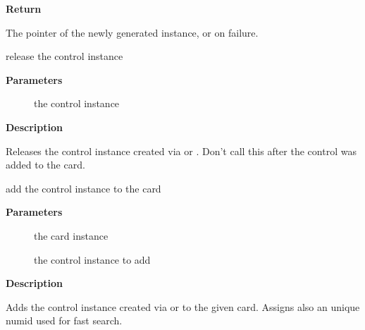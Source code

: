 \documentclass[a4paper,8pt,english]{sphinxmanual}
\begin{document}
\textbf{Return}

The pointer of the newly generated instance, or  on failure.

\begin{fulllineitems}
\label{sound/kernel-api/alsa-driver-api:c.snd_ctl_free_one}
release the control instance

\end{fulllineitems}


\textbf{Parameters}
\begin{description}
\item[{}] \leavevmode
the control instance

\end{description}

\textbf{Description}

Releases the control instance created via {\hyperref[sound/kernel\string-api/alsa\string-driver\string-api:c.snd_ctl_new]{\emph{}}}
or .
Don't call this after the control was added to the card.

\begin{fulllineitems}
\label{sound/kernel-api/alsa-driver-api:c.snd_ctl_add}
add the control instance to the card

\end{fulllineitems}


\textbf{Parameters}
\begin{description}
\item[{}] \leavevmode
the card instance

\item[{}] \leavevmode
the control instance to add

\end{description}

\textbf{Description}

Adds the control instance created via {\hyperref[sound/kernel\string-api/alsa\string-driver\string-api:c.snd_ctl_new]{\emph{}}} or
 to the given card. Assigns also an unique
numid used for fast search.
\end{document}
